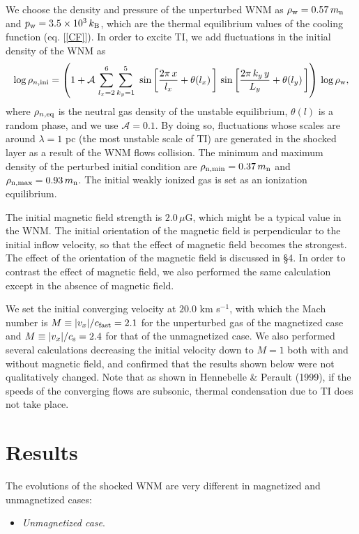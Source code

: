 \documentclass[12pt,preprint]{aastex}
\begin{document}
We choose the density and pressure of the unperturbed WNM as $\rho_{\rm w}=0.57\,m_{\rm n}$ and $p_{\rm w}=3.5\times10^{3}\,k_{\rm B}$, which are the thermal equilibrium values of the cooling function (eq. [\ref{CF}]).
In order to excite TI, we add fluctuations in the initial density of the WNM as
\begin{equation}
\log \rho_{n,\rm ini} = \left( 1+\mathcal{A}\,\sum_{l_{x}=2}^{6}\sum_{k_{y}=1}^{5}\,\,\sin\left[\frac{2\pi\,x}{l_{x}}+\theta(l_{x})\,\right]\,\sin\left[\frac{2\pi\,k_{y}\,y}{L_{y}}+\theta(l_{y})\,\right] \right)\,\log \rho_{\rm w},
\end{equation}
where $\rho_{n, \rm eq}$ is the neutral gas density of the unstable equilibrium, $\theta(l)$ is a random phase, and we use $\mathcal{A}=0.1$.
By doing so, fluctuations whose scales are around $\lambda = 1$ pc (the most unstable scale of TI) are generated in the shocked layer as a result of the WNM flows collision.
The minimum and maximum density of the perturbed initial condition are $\rho_{\rm n,min}=0.37\,m_{\rm n}$ and $\rho_{\rm n,max}=0.93\,m_{\rm n}$.
The initial weakly ionized gas is set as an ionization equilibrium.

The initial magnetic field strength is $2.0\,\mu$G, which might be a typical value in the WNM.
The initial orientation of the magnetic field is perpendicular to the initial inflow velocity, so that the effect of magnetic field becomes the strongest.
The effect of the orientation of the magnetic field is discussed in \S 4.
In order to contrast the effect of magnetic field, we also performed the same calculation except in the absence of magnetic field.

We set the initial converging velocity at $20.0$ km s$^{-1}$, with which the Mach number is $M\equiv |v_{x}|/c_{\rm fast}=2.1$ for the unperturbed gas of the magnetized case and $M\equiv |v_{x}|/c_{\rm s}=2.4$ for that of the unmagnetized case.
We also performed several calculations decreasing the initial velocity down to $M=1$ both with and without magnetic field, and confirmed that the results shown below were not qualitatively changed.
Note that as shown in Hennebelle \& Perault (1999), if the speeds of the converging flows are subsonic, thermal condensation due to TI does not take place.


\section{Results}
The evolutions of the shocked WNM are very different in magnetized and unmagnetized cases:
\begin{itemize}
\item \textit{Unmagnetized case}.
\end{itemize}
\end{document}
